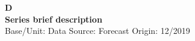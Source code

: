 \documentclass[a4paper,10pt]{article}
\begin{document}
\thispagestyle{empty}
\begin{landscape}
\begin{center}

\textbf{D} \\ 

\textbf{Series brief description} \\ 

Base/Unit: 
\space \space \space Data Source:  
\space \space \space Forecast Origin: 12/2019 \\ 
\end{center}

\begin{footnotesize} \singlespacing  \end{footnotesize} 

\end{landscape}
\end{document}
